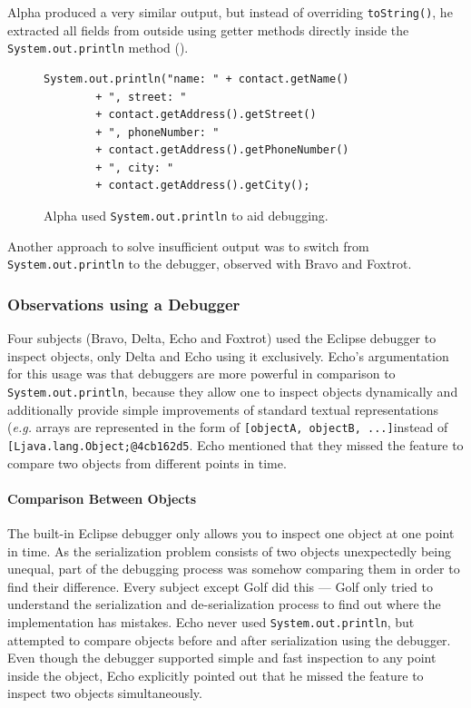 \documentclass[english]{scrartcl}
\newcommand{\eg}{\emph{e.g.}\xspace}
\newcommand{\println}{\texttt{Sys\-tem.\-out.\-println}\xspace}
\begin{document}
Alpha produced a very similar output, but instead of overriding \texttt{toString()}, he extracted all fields from outside using getter methods directly inside the \println method ().

\begin{figure}[h]
\begin{lstlisting}
System.out.println("name: " + contact.getName()
		+ ", street: "
		+ contact.getAddress().getStreet()
		+ ", phoneNumber: "
		+ contact.getAddress().getPhoneNumber()
		+ ", city: "
		+ contact.getAddress().getCity();
\end{lstlisting}
  \caption{Alpha used \texttt{\println} to aid debugging.}
\end{figure}

Another approach to solve insufficient output was to switch from \println to the debugger, observed with Bravo and Foxtrot.

\subsubsection{Observations using a Debugger}
Four subjects (Bravo, Delta, Echo and Foxtrot) used the Eclipse debugger to inspect objects, only Delta and Echo using it exclusively.
Echo's argumentation for this usage was that debuggers are more powerful in comparison to \println, because they allow one to inspect objects dynamically and additionally provide simple improvements of standard textual representations (\eg arrays are represented in the form of \texttt{[objectA, objectB, ...]}instead of \texttt{[Ljava.lang.Object;@4cb162d5}.
Echo mentioned that they missed the feature to compare two objects from different points in time.

\paragraph{Comparison Between Objects}
The built-in Eclipse debugger only allows you to inspect one object at one point in time.
As the serialization problem consists of two objects unexpectedly  being unequal, part of the debugging process was somehow comparing them in order to find their difference.
Every subject except Golf did this --- Golf only tried to understand the serialization and de-serialization process to find out where the implementation has mistakes.
Echo never used \println, but attempted to compare objects before and after serialization using the debugger.
Even though the debugger supported simple and fast inspection to any point inside the object, Echo explicitly pointed out that he missed the feature to inspect two objects simultaneously.
\end{document}
